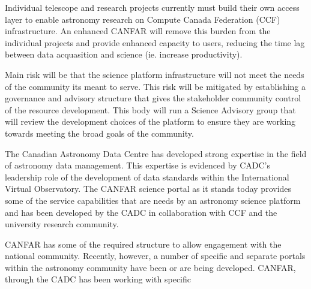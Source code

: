 \documentclass[11pt]{article}
\begin{document}
\begin{lrptextbox}
Individual telescope and research projects currently must build their own access layer to enable astronomy research on Compute Canada Federation (CCF) infrastructure.  An enhanced CANFAR will remove this burden from the individual projects and provide enhanced capacity to users, reducing the time lag between data acquasition and science (ie. increase productivity).
\end{lrptextbox}

\begin{lrptextbox}
Main risk will be that the science platform infrastructure will not meet the needs of the community its meant to serve.  This risk will be mitigated by establishing a governance and advisory structure that gives the stakeholder community control of the resource development.  This body will run a Science Advisory group that will review the development choices of the platform to ensure they are working towards meeting the broad goals of the community.  
\end{lrptextbox}

\begin{lrptextbox} 
The Canadian Astronomy Data Centre has developed strong expertise in the field of  astronomy data management. This expertise is evidenced by CADC's leadership role of the development of data standards within the International Virtual Observatory.  The CANFAR science portal as it stands today provides some of the service capabilities that are needs by an astronomy science platform and has been developed by the CADC in collaboration with CCF and the university research community. 
\end{lrptextbox}

\begin{lrptextbox} 
CANFAR has some of the required structure to allow engagement with the national community.  Recently, however, a number of  specific and separate portals within the astronomy community have been or are being developed. 
CANFAR, through the CADC has been working with specific 
\end{lrptextbox}
\end{document}
